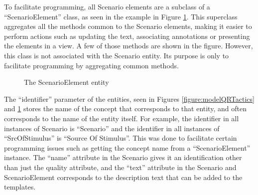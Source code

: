 \documentclass{llncs}
\begin{document}
To facilitate programming, all Scenario elements are a subclass of a ``ScenarioElement'' class, as seen in the example in Figure \ref{figure:modelScenarioElement}. This superclass aggregates all the methods common to the Scenario elements, making it easier to perform actions such as updating the text, associating annotations or presenting the elements in a view. A few of those methods are shown in the figure. However, this class is not associated with the Scenario entity. Its purpose is only to facilitate programming by aggregating common methods. 

\begin{figure}
\centering
\renewcommand {\umltextcolor}{black}
\renewcommand {\umlfillcolor}{none}
\renewcommand {\umldrawcolor}{black}

\caption{The ScenarioElement entity}
\label{figure:modelScenarioElement}
\end{figure}

The ``identifier'' parameter of the entities, seen in Figures \ref{figure:modelQRTactics} and \ref{figure:modelScenarioElement} stores the name of the concept that corresponds to that entity, and often corresponds to the name of the entity itself. For example, the identifier in all instances of Scenario is ``Scenario'' and the identifier in all instances of ``SrcOfStimulus'' is ``Source Of Stimulus''. This was done to facilitate certain programming issues such as getting the concept name from a ``ScenarioElement'' instance. The ``name'' attribute in the Scenario gives it an identification other than just the quality attribute, and the ``text'' attribute in the Scenario and ScenarioElement corresponds to the description text that can be added to the templates.
\end{document}
